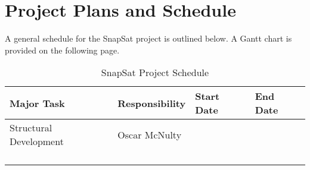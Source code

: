 \section{Project Plans and Schedule}
A general schedule for the SnapSat project is outlined below. A Gantt chart is provided on the following page.
\begin{table}[H]
    \centering
    \caption{SnapSat Project Schedule}
    \vspace{0.15cm}
    \label{tab:designoverview}
    {\renewcommand{\arraystretch}{1.4}%
        \begin{tabular}{|>{\arraybackslash}m{3.5cm}|>{\arraybackslash}m{4cm}|>{\arraybackslash}m{3.2cm}|>{\arraybackslash}m{3.2cm}|}
            \hline
            \textbf{Major Task} & \textbf{Responsibility} & {\bf Start Date} & {\bf End Date} \\ \hline\hline
            Structural Development & Oscar McNulty & & \\\hline
             & & & \\\hline
             & & & \\\hline
             & & & \\\hline
             & & & \\\hline
        \end{tabular} } 
    \end{table}
    
